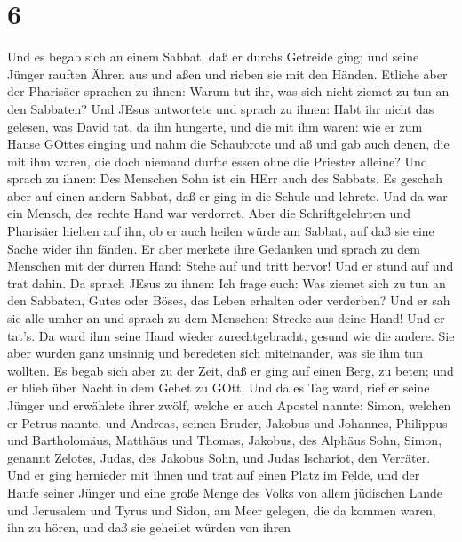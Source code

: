 \hypertarget{section-5}{%
\section{6}\label{section-5}}

 Und es begab sich an einem Sabbat, daß er durchs Getreide
ging; und seine Jünger rauften Ähren aus und aßen und rieben sie mit den
Händen.  Etliche aber der Pharisäer sprachen zu ihnen: Warum
tut ihr, was sich nicht ziemet zu tun an den Sabbaten?  Und
JEsus antwortete und sprach zu ihnen: Habt ihr nicht das gelesen, was
David tat, da ihn hungerte, und die mit ihm waren:  wie er
zum Hause GOttes einging und nahm die Schaubrote und aß und gab auch
denen, die mit ihm waren, die doch niemand durfte essen ohne die
Priester alleine?  Und sprach zu ihnen: Des Menschen Sohn
ist ein HErr auch des Sabbats.  Es geschah aber auf einen
andern Sabbat, daß er ging in die Schule und lehrete. Und da war ein
Mensch, des rechte Hand war verdorret.  Aber die
Schriftgelehrten und Pharisäer hielten auf ihn, ob er auch heilen würde
am Sabbat, auf daß sie eine Sache wider ihn fänden.  Er aber
merkete ihre Gedanken und sprach zu dem Menschen mit der dürren Hand:
Stehe auf und tritt hervor! Und er stund auf und trat dahin.
 Da sprach JEsus zu ihnen: Ich frage euch: Was ziemet sich
zu tun an den Sabbaten, Gutes oder Böses, das Leben erhalten oder
verderben?  Und er sah sie alle umher an und sprach zu dem
Menschen: Strecke aus deine Hand! Und er tat's. Da ward ihm seine Hand
wieder zurechtgebracht, gesund wie die andere.  Sie aber
wurden ganz unsinnig und beredeten sich miteinander, was sie ihm tun
wollten.  Es begab sich aber zu der Zeit, daß er ging auf
einen Berg, zu beten; und er blieb über Nacht in dem Gebet zu GOtt.
 Und da es Tag ward, rief er seine Jünger und erwählete
ihrer zwölf, welche er auch Apostel nannte:  Simon, welchen
er Petrus nannte, und Andreas, seinen Bruder, Jakobus und Johannes,
Philippus und Bartholomäus,  Matthäus und Thomas, Jakobus,
des Alphäus Sohn, Simon, genannt Zelotes,  Judas, des
Jakobus Sohn, und Judas Ischariot, den Verräter.  Und er
ging hernieder mit ihnen und trat auf einen Platz im Felde, und der
Haufe seiner Jünger und eine große Menge des Volks von allem jüdischen
Lande und Jerusalem und Tyrus und Sidon, am Meer gelegen, 
die da kommen waren, ihn zu hören, und daß sie geheilet würden von ihren
